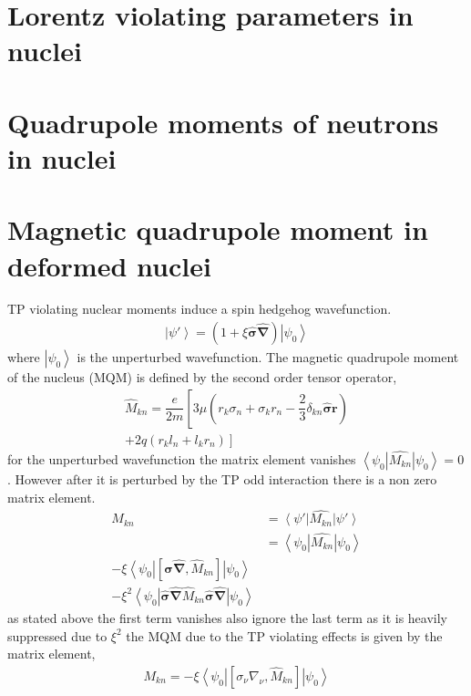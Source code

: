 \documentclass[10pt,a4paper, twoside]{report}
\begin{document}
\section{Lorentz violating parameters in nuclei}
\section{Quadrupole moments of neutrons in nuclei}
\section{Magnetic quadrupole moment in deformed nuclei}
TP violating nuclear moments induce a spin hedgehog wavefunction.
\begin{align*}
\left|\psi'\right> = \left(1 + \xi\hat{\boldsymbol{\sigma}}\hat{\boldsymbol{\nabla}}\right)\left|\psi_0\right>
\end{align*}
where $\left|\psi_0\right>$ is the unperturbed wavefunction. The magnetic quadrupole moment of the nucleus (MQM) is defined by the second order tensor operator,
\begin{align*}
\hat{M}_{kn} = \dfrac{e}{2m}\left[3\mu\left(r_k\sigma_n + \sigma_kr_n - \dfrac{2}{3}\delta_{kn}\hat{\boldsymbol{\sigma}}\textbf{r}\right) \right. \\
\left. + 2q\left(r_kl_n + l_kr_n\right)\right]
\end{align*}
for the unperturbed wavefunction the matrix element vanishes $\left<\psi_0\right|\hat{M_{kn}}\left|\psi_0\right> = 0$. However after it is perturbed by the TP odd interaction there is a non zero matrix element.
\begin{align*}
M_{kn} &= \left<\psi'\right|\hat{M_{kn}}\left|\psi'\right> \\
&= \left<\psi_0\right|\hat{M_{kn}}\left|\psi_0\right> \\
-\xi  \left<\psi_0\right|\left[\hat{\boldsymbol{\sigma}}\hat{\boldsymbol{\nabla}}, \hat{M}_{kn}\right]\left|\psi_0\right> \\ - \xi^{2} \left<\psi_0\right|\hat{\boldsymbol{\sigma}}\hat{\boldsymbol{\nabla}}\hat{M}_{kn}\hat{\boldsymbol{\sigma}}\hat{\boldsymbol{\nabla}}\left|\psi_0\right>
\end{align*}
as stated above the first term vanishes also ignore the last term as it is heavily suppressed due to $\xi^2$ the MQM due to the TP violating effects is given by the matrix element,
\begin{align*}
M_{kn} = -\xi  \left<\psi_0\right|\left[\sigma_{\nu}\nabla_{\nu}, \hat{M}_{kn}\right]\left|\psi_0\right>
\end{align*}
\end{document}
